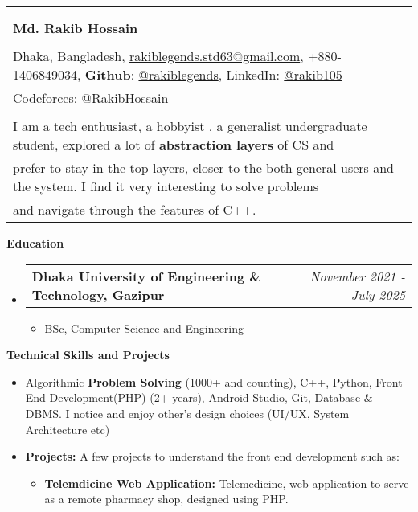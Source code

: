 \documentclass[legalpaper,10pt]{article}
\makeatletter
\newcommand{\resheading}[1]{{\large \colorbox{mygrey}{\begin{minipage}{\textwidth}{\textbf{#1 \vphantom{p\^{E}}}}\end{minipage}}}}
\newcommand{\ressubheading}[4]{
	\begin{tabular*}{7.1in}{l@{\extracolsep{\fill}}r}
		\textbf{#1} & \textit{#4} \\
	\end{tabular*}\vspace{-6pt}}
\makeatother
\begin{document}
	\begin{tabular*}{7.5in}{l@{\extracolsep{\fill}}}
		\\
		\\
		\\
		\textbf{\large Md. Rakib Hossain}\\
		\\
		Dhaka, Bangladesh, \href{mailto:rakiblegends.std63@gmail.com}{rakiblegends.std63@gmail.com}, +880-1406849034, \textbf{Github}: \href{https://github.com/rakiblegends}{@rakiblegends}, LinkedIn: \href{https://www.linkedin.com/in/rakib105/}{@rakib105} \\
		 Codeforces: \href{https://codeforces.com/profile/RakibHossain}{@RakibHossain}
		\\
		\\
		I am a tech enthusiast, a hobbyist , a generalist undergraduate student, explored a lot of \textbf{abstraction layers} of CS and \\prefer to stay in the top layers, closer to the both general users and the system. I find it very interesting to solve problems\\ and navigate through the features of C++.
	\end{tabular*}
	
	\vspace{0.25in}
	
	\resheading{Education}
	\begin{itemize}
	
		\item \ressubheading{Dhaka University of Engineering \& Technology, Gazipur}{}{}{November 2021 - July 2025}
		\begin{itemize}
			\item BSc, Computer Science and Engineering
		\end{itemize}

	\end{itemize}
	
	\vspace{0.20in}
	
	
	
	\resheading{Technical Skills and Projects}
	\begin{itemize}  
		\item Algorithmic \textbf{Problem Solving} (1000+ and counting), C++, Python, Front End Development(PHP) (2+ years), Android Studio, Git, Database \& DBMS. I notice and enjoy other's design choices (UI/UX, System Architecture etc)
    	 \item \textbf{Projects:} A few projects to understand the front end development such as:
    	    \begin{itemize}
    	        \item \textbf{Telemdicine Web Application:}         \href{https://github.com/rakiblegends/Telemedicine}{Telemedicine}, web application to serve as a remote pharmacy shop, designed using PHP.
    	    \end{itemize}
		
    	\vspace{0.03in}

		\vspace{0.03in}


	\end{itemize}
\end{document}
